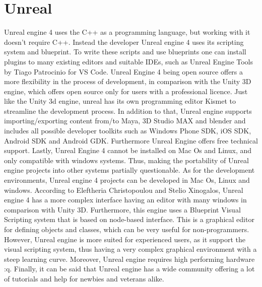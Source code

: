 \documentclass[
	12pt, 
	a4paper, 
]{article}
\begin{document}
	\section{Unreal}
	Unreal engine 4 uses the C++ as a programming language, but working with it doesn't require C++. Instead the developer Unreal engine 4 uses its scripting system and blueprint\cite{hamalainen2020game}. To write these scripts and use blueprints one can install plugins to many existing editors and suitable IDEs, such as Unreal Engine Tools by Tiago Patrocinio for VS Code. Unreal Engine 4 being open source offers a more flexibility in the process of development, in comparison with the Unity 3D engine, which offers open source only for users with a professional licence\cite{christopoulou2017overview}.\newline
	Just like the Unity 3d engine, unreal has its own programming editor Kismet to streamline the development process. In addition to that, Unreal engine supports importing/exporting content from/to Maya, 3D Studio MAX and blender and includes all possible developer toolkits such as Windows Phone SDK, iOS SDK, Android SDK and Android GDK. Furthermore Unreal Engine offers free technical support. Lastly, Unreal Engine 4 cannot be installed on Mac Os and Linux, and only compatible with windows systems. Thus, making the portability of Unreal engine projects into other systems partially questionable\cite{christopoulou2017overview}.\newline
	As for the development environments, Unreal engine 4 projects can be developed in Mac Os, Linux and windows. According to Eleftheria Christopoulou and Stelio Xinogalos, Unreal engine 4 has a more complex interface having an editor with many windows in comparison with Unity 3D. Furthermore, this engine uses a Blueprint Visual Scripting system that is based on node-based interface. This is a graphical editor for defining objects and classes, which can be very useful for non-programmers. However, Unreal engine is more suited for experienced users, as it support the visual scripting system, thus having a very complex graphical environment with a steep learning curve. Moreover, Unreal engine requires high performing hardware :q\cite{christopoulou2017overview}. Finally, it can be said that Unreal engine has a wide community offering a lot of tutorials and help for newbies and veterans alike.
\end{document}
